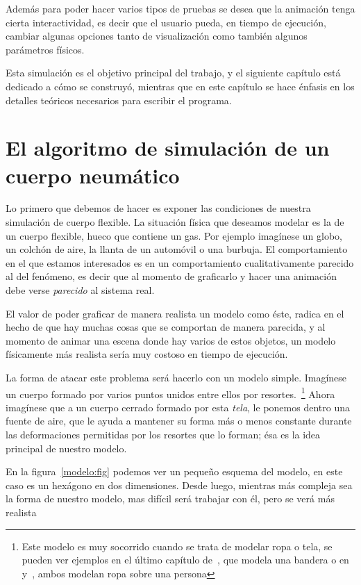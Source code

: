 Además para poder hacer varios tipos de pruebas se desea que la animación tenga cierta interactividad, es decir que el usuario pueda, en tiempo de ejecución, cambiar algunas opciones tanto de visualización como también algunos parámetros físicos.

Esta simulación es el objetivo principal del trabajo, y el siguiente capítulo está dedicado a cómo se construyó, mientras que en este capítulo se hace énfasis en los detalles teóricos necesarios para escribir el programa.

\section{El algoritmo de simulación de un cuerpo neumático}

Lo primero que debemos de hacer es exponer las condiciones de nuestra simulación de cuerpo flexible. La situación física que deseamos modelar es la de un cuerpo flexible, hueco que contiene un gas. Por ejemplo imagínese un globo, un colchón de aire, la llanta de un automóvil o una burbuja. El comportamiento en el que estamos interesados es en un comportamiento cualitativamente parecido al del fenómeno, es decir que al momento de graficarlo y hacer una animación debe verse \emph{parecido} al sistema real.

El valor de poder graficar de manera realista un modelo como éste, radica en el hecho de que hay muchas cosas que se comportan de manera parecida, y al momento de animar una escena donde hay varios de estos objetos, un modelo físicamente más realista sería muy costoso en tiempo de ejecución.

La forma de atacar este problema será hacerlo con un modelo simple. Imagínese un cuerpo formado por varios puntos unidos entre ellos por resortes.~\footnote{Este modelo es muy socorrido cuando se trata de modelar ropa o tela, se pueden ver ejemplos en el último capítulo de~\cite{FisicaVideojuegos}, que modela una bandera o en~\cite{Vassilev:Ropa} y~\cite{Provot:Ropa}, ambos modelan ropa sobre una persona} Ahora imagínese que a un cuerpo cerrado formado por esta \emph{tela}, le ponemos dentro una fuente de aire, que le ayuda a mantener su forma más o menos constante durante las deformaciones permitidas por los resortes que lo forman; ésa es la idea principal de nuestro modelo.

En la figura~\ref{modelo:fig} podemos ver un pequeño esquema del modelo, en este caso es un hexágono en dos dimensiones. Desde luego, mientras más compleja sea la forma de nuestro modelo, mas difícil será trabajar con él, pero se verá más realista 


